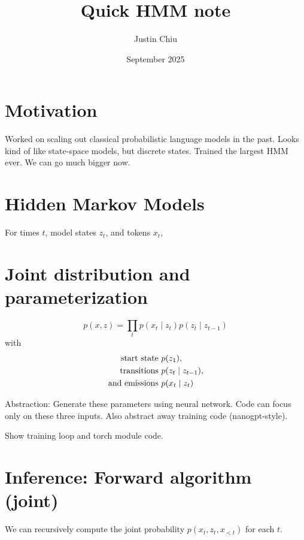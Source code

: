 \documentclass{article}
\title{Quick HMM note}
\author{Justin Chiu}
\date{September 2025}
\newcommand{\edge}[2]{\draw[->] (#1) -- (#2);}
\begin{document}
\maketitle

\section{Motivation}
Worked on scaling out classical probabilistic language models in the past.
Looks kind of like state-space models, but discrete states.
Trained the largest HMM ever.
We can go much bigger now.

\section{Hidden Markov Models}

For times $t$, model states $z_t$, and tokens $x_t$,

\begin{center}
\end{center}

\section{Joint distribution and parameterization}
$$p(x,z) = \prod_t p(x_t \mid z_t)p(z_t \mid z_{t-1})$$
with
\begin{align*}
\textnormal{start state } & p(z_1),\\
\textnormal{transitions } & p(z_t \mid z_{t-1}),\\
\textnormal{and emissions } &  p(x_t \mid z_t)
\end{align*}

Abstraction: Generate these parameters using neural network. Code can focus only on these three inputs.
Also abstract away training code (nanogpt-style).

Show training loop and torch module code.

\section{Inference: Forward algorithm (joint)}
We can recursively compute the joint probability
$p(x_t,z_t, x_{<t})$ for each $t$.
\end{document}
